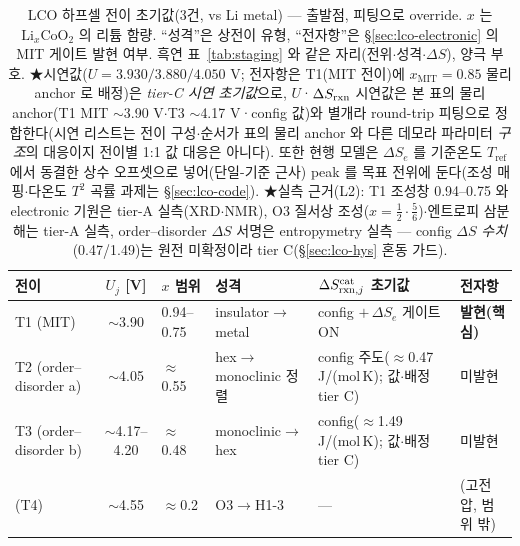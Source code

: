 \begin{table}[t]
\centering\footnotesize
\renewcommand{\arraystretch}{1.3}
\caption{LCO 하프셀 전이 초기값(3건, vs Li metal) --- 출발점, 피팅으로 override. $x$ 는
$\mathrm{Li}_x\mathrm{CoO_2}$ 의 리튬 함량. ``성격''은 상전이 유형, ``전자항''은 \S\ref{sec:lco-electronic} 의 MIT
게이트 발현 여부. 흑연 표~\ref{tab:staging} 와 같은 자리(전위$\cdot$성격$\cdot\Delta S$), 양극 부호.
★시연값($U{=}3.930/3.880/4.050$ V; 전자항은 T1(MIT 전이)에
$x_\mathrm{MIT}{=}0.85$ 물리 anchor 로 배정)은
\emph{tier-C 시연 초기값}으로, $U$·$\Delta S_{\mathrm{rxn}}$ 시연값은 본 표의 물리 anchor(T1 MIT $\sim$3.90 V$\cdot$T3 $\sim$4.17 V·config 값)와
별개라 round-trip 피팅으로 정합한다(시연 리스트는 전이 구성$\cdot$순서가 표의 물리 anchor 와 다른 데모라 파라미터 \emph{구조}의 대응이지 전이별 1:1 값 대응은 아니다). 또한 현행 모델은 $\Delta S_e$ 를 기준온도 $T_\mathrm{ref}$ 에서
동결한 상수 오프셋으로 넣어(단일-기준 근사) peak 를 목표 전위에 둔다(조성 매핑$\cdot$다온도 $T^2$ 곡률
과제는 \S\ref{sec:lco-code}). ★실측 근거(L2): T1 조성창 0.94--0.75 와 electronic 기원은 tier-A
실측\cite{menetrier1999}(XRD$\cdot$NMR), O3 질서상 조성($x{=}\tfrac12\cdot\tfrac56$)$\cdot$엔트로피 삼분해는 tier-A
실측\cite{reynier2004}, order--disorder $\Delta S$ 서명은 entropymetry 실측\cite{kim_entropymetry2020} ---
config $\Delta S$ \emph{수치}(0.47/1.49)는 원전 미확정이라 tier C(\S\ref{sec:lco-hys} 혼동 가드).}
\label{tab:lco-staging}
\begin{tabular}{@{}p{} c p{} p{} p{} p{}@{}}
\toprule
전이 & $U_j$ [V] & $x$ 범위 & 성격 & $\Delta S_{\mathrm{rxn},j}^\mathrm{cat}$ 초기값 & 전자항 \\
\midrule
T1 (MIT)              & $\sim$3.90        & 0.94--0.75 & insulator$\to$metal       & config $+\,\Delta S_e$ 게이트 ON & \textbf{발현(핵심)} \\
T2 (order--disorder a)& $\sim$4.05        & $\approx$0.55 & hex$\to$monoclinic 정렬 & config 주도($\approx$0.47 J/(mol\,K); 값$\cdot$배정 tier C) & 미발현 \\
T3 (order--disorder b)& $\sim$4.17--4.20  & $\approx$0.48 & monoclinic$\to$hex      & config($\approx$1.49 J/(mol\,K); 값$\cdot$배정 tier C) & 미발현 \\
\midrule
(T4)                  & $\sim$4.55        & $\approx$0.2 & O3$\to$H1-3              & --- & (고전압, 범위 밖) \\
\bottomrule
\end{tabular}
\end{table}

